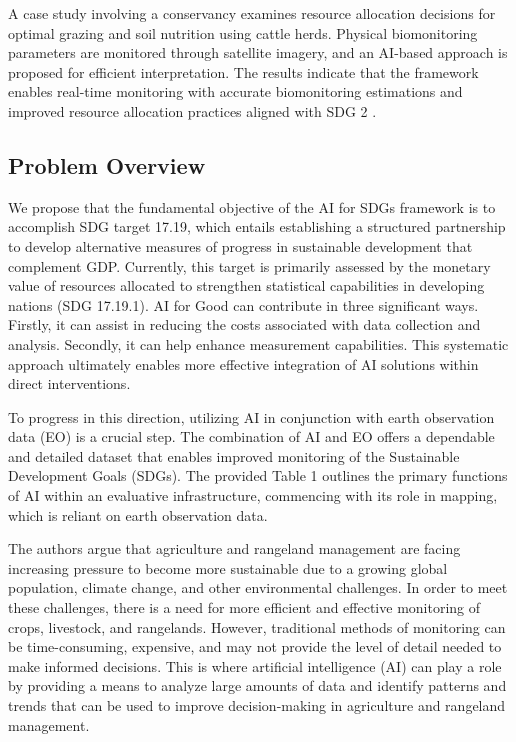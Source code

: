 \documentclass[draft, {\secondLanguage}, english]{volcanica-template}
\begin{document}
A case study involving a conservancy examines resource allocation decisions for optimal grazing and soil nutrition using cattle herds. Physical biomonitoring parameters are monitored through satellite imagery, and an AI-based approach is proposed for efficient interpretation. The results indicate that the framework enables real-time monitoring with accurate biomonitoring estimations and improved resource allocation practices aligned with SDG 2 \parencite{Efremova2023}.

\subsection{Problem Overview}\label{sec:02a}
We propose that the fundamental objective of the AI for SDGs framework is to accomplish SDG target 17.19, which entails establishing a structured partnership to develop alternative measures of progress in sustainable development that complement GDP. Currently, this target is primarily assessed by the monetary value of resources allocated to strengthen statistical capabilities in developing nations (SDG 17.19.1). AI for Good can contribute in three significant ways. Firstly, it can assist in reducing the costs associated with data collection and analysis. Secondly, it can help enhance measurement capabilities. This systematic approach ultimately enables more effective integration of AI solutions within direct interventions.

To progress in this direction, utilizing AI in conjunction with earth observation data (EO) is a crucial step. The combination of AI and EO offers a dependable and detailed dataset that enables improved monitoring of the Sustainable Development Goals (SDGs). The provided Table 1 outlines the primary functions of AI within an evaluative infrastructure, commencing with its role in mapping, which is reliant on earth observation data.


The authors argue that agriculture and rangeland management are facing increasing pressure to become more sustainable due to a growing global population, climate change, and other environmental challenges. In order to meet these challenges, there is a need for more efficient and effective monitoring of crops, livestock, and rangelands. However, traditional methods of monitoring can be time-consuming, expensive, and may not provide the level of detail needed to make informed decisions. This is where artificial intelligence (AI) can play a role by providing a means to analyze large amounts of data and identify patterns and trends that can be used to improve decision-making in agriculture and rangeland management.
\end{document}
